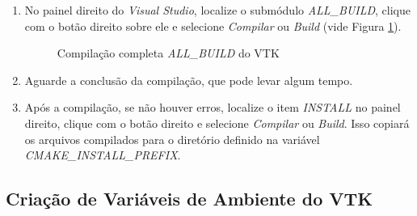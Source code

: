 \documentclass[a4paper,11pt]{article}
\newcommand{\visualstudio}{\textit{Visual Studio}}
\begin{document}
\begin{enumerate}
\begin{enumerate}
		\item No painel direito do \visualstudio{}, localize o submódulo \emph{ALL\_BUILD}, clique com o botão direito sobre ele e selecione \emph{Compilar} ou \emph{Build} (vide Figura \ref{fig:vtkvsprojectall}).
		
		\begin{figure}[H]\centering
			\caption{Compilação completa \emph{ALL\_BUILD} do VTK}\label{fig:vtkvsprojectall}
		\end{figure}
		
		\item Aguarde a conclusão da compilação, que pode levar algum tempo.
		\item Após a compilação, se não houver erros, localize o item \emph{INSTALL} no painel direito, clique com o botão direito e selecione \emph{Compilar} ou \emph{Build}. Isso copiará os arquivos compilados para o diretório definido na variável \emph{CMAKE\_INSTALL\_PREFIX}.
	\end{enumerate}
\end{enumerate}

\subsection*{Criação de Variáveis de Ambiente do VTK}
\end{document}
